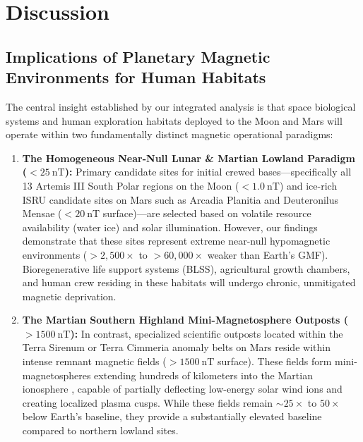 \section{Discussion}
\label{sec:discussion}

\subsection{Implications of Planetary Magnetic Environments for Human Habitats}
The central insight established by our integrated analysis is that space biological systems and human exploration habitats deployed to the Moon and Mars will operate within two fundamentally distinct magnetic operational paradigms:

\begin{enumerate}
    \item \textbf{The Homogeneous Near-Null Lunar \& Martian Lowland Paradigm ($<\SI{25}{\nano\tesla}$):} Primary candidate sites for initial crewed bases—specifically all 13 Artemis III South Polar regions on the Moon ($< \SI{1.0}{\nano\tesla}$) and ice-rich ISRU candidate sites on Mars such as Arcadia Planitia and Deuteronilus Mensae ($< \SI{20}{\nano\tesla}$ surface)—are selected based on volatile resource availability (water ice) and solar illumination. However, our findings demonstrate that these sites represent extreme near-null hypomagnetic environments ($>2,500\times$ to $>60,000\times$ weaker than Earth's GMF). Bioregenerative life support systems (BLSS), agricultural growth chambers, and human crew residing in these habitats will undergo chronic, unmitigated magnetic deprivation.
    \item \textbf{The Martian Southern Highland Mini-Magnetosphere Outposts ($>\SI{1500}{\nano\tesla}$):} In contrast, specialized scientific outposts located within the Terra Sirenum or Terra Cimmeria anomaly belts on Mars reside within intense remnant magnetic fields ($>\SI{1500}{\nano\tesla}$ surface). These fields form mini-magnetospheres extending hundreds of kilometers into the Martian ionosphere \citep{Mitchell2001}, capable of partially deflecting low-energy solar wind ions and creating localized plasma cusps. While these fields remain $\sim 25\times$ to $50\times$ below Earth's baseline, they provide a substantially elevated baseline compared to northern lowland sites.
\end{enumerate}

